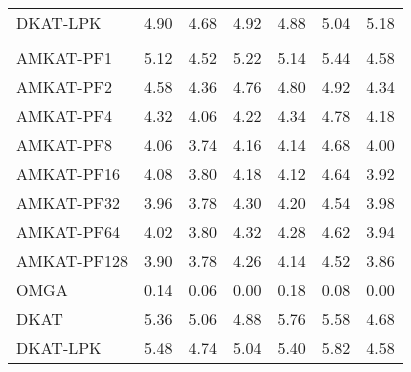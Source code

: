 \documentclass[a4paper,oneside,10pt]{article}\usepackage[]{graphicx}\usepackage[]{color}
\newenvironment{knitrout}{}{} %
\begin{document}
\begin{knitrout}
\begin{table}
\begin{tabular}[t]{lrrrrrr}
\hspace{1em}DKAT-LPK & 4.90 & 4.68 & 4.92 & 4.88 & 5.04 & 5.18\\
\addlinespace[0.3em]
\multicolumn{7}{l}{\textbf{Multivariate Cauchy errors}}\\
\hspace{1em}AMKAT-PF1 & 5.12 & 4.52 & 5.22 & 5.14 & 5.44 & 4.58\\
\hspace{1em}AMKAT-PF2 & 4.58 & 4.36 & 4.76 & 4.80 & 4.92 & 4.34\\
\hspace{1em}AMKAT-PF4 & 4.32 & 4.06 & 4.22 & 4.34 & 4.78 & 4.18\\
\hspace{1em}AMKAT-PF8 & 4.06 & 3.74 & 4.16 & 4.14 & 4.68 & 4.00\\
\hspace{1em}AMKAT-PF16 & 4.08 & 3.80 & 4.18 & 4.12 & 4.64 & 3.92\\
\hspace{1em}AMKAT-PF32 & 3.96 & 3.78 & 4.30 & 4.20 & 4.54 & 3.98\\
\hspace{1em}AMKAT-PF64 & 4.02 & 3.80 & 4.32 & 4.28 & 4.62 & 3.94\\
\hspace{1em}AMKAT-PF128 & 3.90 & 3.78 & 4.26 & 4.14 & 4.52 & 3.86\\
\hspace{1em}OMGA & 0.14 & 0.06 & 0.00 & 0.18 & 0.08 & 0.00\\
\hspace{1em}DKAT & 5.36 & 5.06 & 4.88 & 5.76 & 5.58 & 4.68\\
\hspace{1em}DKAT-LPK & 5.48 & 4.74 & 5.04 & 5.40 & 5.82 & 4.58\\
\bottomrule
\end{tabular}
\end{table}

\end{knitrout}
\end{document}
